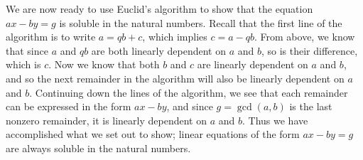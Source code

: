 \documentclass[a4paper,twocolumn]{article}
\begin{document}
We are now ready to use Euclid's algorithm to show that the equation $ax-by=g$ is soluble
in the natural numbers.
Recall that the first line of the algorithm is to write $a=qb+c$, which implies $c=a-qb.$
From above, we know that since $a$ and $qb$ are both linearly dependent on $a$ and $b$, so
is their difference, which is $c$. Now we know that both $b$ and $c$ are linearly dependent
on $a$ and $b$, and so the next remainder in the algorithm will also be linearly dependent on
$a$ and $b$. Continuing down the lines of the algorithm, we see that each remainder can
be expressed in the form $ax-by$, and since $g=\gcd(a,b)$ is the last nonzero remainder, it is
linearly dependent on $a$ and $b$. Thus we have accomplished what we set out to show; linear equations
of the form $ax-by=g$ are always soluble in the natural numbers.
\end{document}

